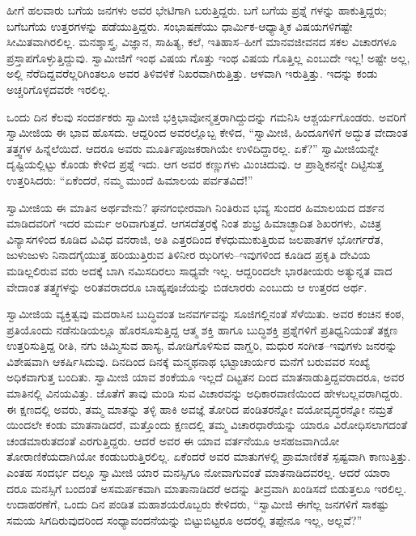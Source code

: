 ಹೀಗೆ ಹಲವಾರು ಬಗೆಯ ಜನಗಳು ಅವರ ಭೇಟಿಗಾಗಿ ಬರುತ್ತಿದ್ದರು. ಬಗೆ ಬಗೆಯ ಪ್ರಶ್ನೆ ಗಳನ್ನು ಹಾಕುತ್ತಿದ್ದರು; ಬಗೆಬಗೆಯ ಉತ್ತರಗಳನ್ನು ಪಡೆಯುತ್ತಿದ್ದರು. ಸಂಭಾಷಣೆಯು ಧಾರ್ಮಿಕ-ಆಧ್ಯಾತ್ಮಿಕ ವಿಷಯಗಳಿಗಷ್ಟೇ ಸೀಮಿತವಾಗಿರಲಿಲ್ಲ. ಮನಶ್ಶಾಸ್ತ್ರ, ವಿಜ್ಞಾನ, ಸಾಹಿತ್ಯ, ಕಲೆ, ಇತಿಹಾಸ–ಹೀಗೆ ಮಾನವಜೀವನದ ಸಕಲ ವಿಚಾರಗಳೂ ಪ್ರಸ್ತಾಪಗೊಳ್ಳುತ್ತಿದ್ದುವು. ಸ್ವಾಮೀಜಿಗೆ ಇಂಥ ವಿಷಯ ಗೊತ್ತು ಇಂಥ ವಿಷಯ ಗೊತ್ತಿಲ್ಲ ಎಂಬುದೇ ಇಲ್ಲ! ಅಷ್ಟೇ ಅಲ್ಲ, ಅಲ್ಲಿ ನೆರೆದಿದ್ದವರೆಲ್ಲರಿಗಿಂತಲೂ ಅವರ ತಿಳಿವಳಿಕೆ ನಿಖರವಾಗಿರುತ್ತಿತ್ತು. ಆಳವಾಗಿ ಇರುತ್ತಿತ್ತು. ಇದನ್ನು ಕಂಡು ಅಚ್ಚರಿಗೊಳ್ಳದವರೇ ಇರಲಿಲ್ಲ.

ಒಂದು ದಿನ ಕೆಲವು ಸಂದರ್ಶಕರು ಸ್ವಾಮೀಜಿ ಭಕ್ತಿಭಾವೋನ್ಮತ್ತರಾಗಿದ್ದುದನ್ನು ಗಮನಿಸಿ ಆಶ್ಚರ್ಯಗೊಂಡರು. ಅವರಿಗೆ ಸ್ವಾಮೀಜಿಯ ಈ ಭಾವ ಹೊಸದು. ಆದ್ದರಿಂದ ಅವರಲ್ಲೊಬ್ಬ ಕೇಳಿದ, “ಸ್ವಾಮೀಜಿ, ಹಿಂದೂಗಳಿಗೆ ಅದ್ಭುತ ವೇದಾಂತ ತತ್ತ್ವಗಳ ಹಿನ್ನೆಲೆಯಿದೆ. ಆದರೂ ಅವರು ಮೂರ್ತಿಪೂಜಕರಾಗಿಯೇ ಉಳಿದಿದ್ದಾರಲ್ಲ. ಏಕೆ?” ಸ್ವಾಮೀಜಿಯನ್ನೇ ದೃಷ್ಟಿಯಲ್ಲಿಟ್ಟು ಕೊಂಡು ಕೇಳಿದ ಪ್ರಶ್ನೆ ಇದು. ಆಗ ಅವರ ಕಣ್ಣುಗಳು ಮಿಂಚಿದುವು. ಆ ಪ್ರಾಶ್ನಿಕನನ್ನೇ ದಿಟ್ಟಿಸುತ್ತ ಉತ್ತರಿಸಿದರು: “ಏಕೆಂದರೆ, ನಮ್ಮ ಮುಂದೆ ಹಿಮಾಲಯ ಪರ್ವತವಿದೆ!”

ಸ್ವಾಮೀಜಿಯ ಈ ಮಾತಿನ ಅರ್ಥವೇನು? ಘನಗಂಭೀರವಾಗಿ ನಿಂತಿರುವ ಭವ್ಯ ಸುಂದರ ಹಿಮಾಲಯದ ದರ್ಶನ ಮಾಡಿದವರಿಗೆ ಇದರ ಮರ್ಮ ಅರಿವಾಗುತ್ತದೆ. ಆಗಸದೆತ್ತರಕ್ಕೆ ನಿಂತ ಶುಭ್ರ ಹಿಮಾಚ್ಛಾದಿತ ಶಿಖರಗಳು, ವಿಚಿತ್ರ ವಿನ್ಯಾಸಗಳಿಂದ ಕೂಡಿದ ವಿವಿಧ ವನರಾಜಿ, ಅತಿ ಎತ್ತರದಿಂದ ಕೆಳಧುಮುಕುತ್ತಿರುವ ಜಲಪಾತಗಳ ಭೋರ್ಗರೆತ, ಜುಳುಜುಳು ನಿನಾದಗೈಯುತ್ತ ಹರಿಯುತ್ತಿರುವ ತಿಳಿನೀರ ಝರಿಗಳು–ಇವುಗಳಿಂದ ಕೂಡಿದ ಪ್ರಕೃತಿ ದೇವಿಯ ಮಡಿಲ್ಲಲಿರುವ ವರು ಅದಕ್ಕೆ ಬಾಗಿ ನಮಿಸದಿರಲು ಸಾಧ್ಯವೇ ಇಲ್ಲ. ಆದ್ದರಿಂದಲೇ ಭಾರತೀಯರು ಅತ್ಯುನ್ನತ ವಾದ ವೇದಾಂತ ತತ್ತ್ವಗಳನ್ನು ಅರಿತವರಾದರೂ ಬಾಹ್ಯಪೂಜೆಯನ್ನು ಬಿಡಲಾರರು ಎಂಬುದು ಆ ಉತ್ತರದ ಅರ್ಥ.

ಸ್ವಾಮೀಜಿಯ ವ್ಯಕ್ತಿತ್ವವು ಮದರಾಸಿನ ಬುದ್ಧಿವಂತ ಜನವರ್ಗವನ್ನು ಸೂಜಿಗಲ್ಲಿನಂತೆ ಸೆಳೆಯಿತು. ಅವರ ಕಂಚಿನ ಕಂಠ, ಪ್ರತಿಯೊಂದು ನಡೆನುಡಿಯಲ್ಲೂ ಹೊರಸೂಸುತ್ತಿದ್ದ ಆತ್ಮ ಶಕ್ತಿ ಹಾಗೂ ಬುದ್ಧಿಶಕ್ತಿ ಪ್ರಶ್ನೆಗಳಿಗೆ ಪ್ರತಿಧ್ವನಿಯಂತೆ ತಕ್ಷಣ ಉತ್ತರಿಸುತ್ತಿದ್ದ ರೀತಿ, ನಗು ಚಿಮ್ಮಿಸುವ ಹಾಸ್ಯ, ಮೋಡಿಗೊಳಿಸುವ ವಾಗ್ಝರಿ, ಮಧುರ ಸಂಗೀತ–ಇವುಗಳು ಜನರನ್ನು ವಿಶೇಷವಾಗಿ ಆಕರ್ಷಿಸಿದುವು. ದಿನದಿಂದ ದಿನಕ್ಕೆ ಮನ್ಮಥನಾಥ ಭಟ್ಟಾಚಾರ್ಯರ ಮನೆಗೆ ಬರುವವರ ಸಂಖ್ಯೆ ಅಧಿಕವಾಗುತ್ತ ಬಂದಿತು. ಸ್ವಾಮೀಜಿ ಯಾವ ಶಂಕೆಯೂ ಇಲ್ಲದೆ ದಿಟ್ಟತನ ದಿಂದ ಮಾತನಾಡುತ್ತಿದ್ದವರಾದರೂ, ಅವರ ಮಾತಿನಲ್ಲಿ ವಿನಯವಿತ್ತು. ಜೊತೆಗೆ ತಾವು ಮಂಡಿ ಸುವ ವಿಚಾರವನ್ನು ಅಧಿಕಾರವಾಣಿಯಿಂದ ಹೇಳಬಲ್ಲವರಾಗಿದ್ದರು. ಈ ಕ್ಷಣದಲ್ಲಿ ಅವರು, ತಮ್ಮ ಮಾತನ್ನು ತಳ್ಳಿ ಹಾಕಿ ಅವಜ್ಞೆ ತೋರಿದ ಪಂಡಿತರನ್ನೋ ವಯೋವೃದ್ಧರನ್ನೋ ನಮ್ರತೆ ಯಿಂದಲೇ ಕಂಡು ಮಾತನಾಡಿದರೆ, ಮತ್ತೊಂದು ಕ್ಷಣದಲ್ಲಿ ತಮ್ಮ ವಿಚಾರಧಾರೆಯನ್ನು ಯಾರೂ ವಿರೋಧಿಸಲಾಗದಂತೆ ಚಂಡಮಾರುತದಂತೆ ಎರಗುತ್ತಿದ್ದರು. ಆದರೆ ಅವರ ಈ ಯಾವ ವರ್ತನೆಯೂ ಅಸಹಜವಾಗಿಯೋ ತೋರಾಣಿಕೆಯದಾಗಿಯೋ ಕಂಡುಬರುತ್ತಿರಲಿಲ್ಲ. ಏಕೆಂದರೆ ಅವರ ಮಾತುಗಳಲ್ಲಿ ಪ್ರಾಮಾಣಿಕತೆ ಸ್ಪಷ್ಟವಾಗಿ ಕಾಣುತ್ತಿತ್ತು. ಎಂತಹ ಸಂದರ್ಭ ದಲ್ಲೂ ಸ್ವಾಮೀಜಿ ಯಾರ ಮನಸ್ಸಿಗೂ ನೋವಾಗುವಂತೆ ಮಾತನಾಡಿದವರಲ್ಲ. ಆದರೆ ಯಾರಾ ದರೂ ಮನಸ್ಸಿಗೆ ಬಂದಂತೆ ಅಸಮರ್ಪಕವಾಗಿ ಮಾತಾನಾಡಿದರೆ ಅದನ್ನು ತೀವ್ರವಾಗಿ ಖಂಡಿಸದೆ ಬಿಡುತ್ತಲೂ ಇರಲಿಲ್ಲ. ಉದಾಹರಣೆಗೆ, ಒಂದು ದಿನ ಪಂಡಿತ ಮಹಾಶಯರೊಬ್ಬರು ಕೇಳಿದರು, “ಸ್ವಾಮೀಜಿ ಈಗೆಲ್ಲ ಜನಗಳಿಗೆ ಸಾಕಷ್ಟು ಸಮಯ ಸಿಗದಿರುವುದರಿಂದ ಸಂಧ್ಯಾವಂದನೆಯನ್ನು ಬಿಟ್ಟುಬಿಟ್ಟರೂ ಅದರಲ್ಲಿ ತಪ್ಪೇನೂ ಇಲ್ಲ, ಅಲ್ಲವೆ?”

